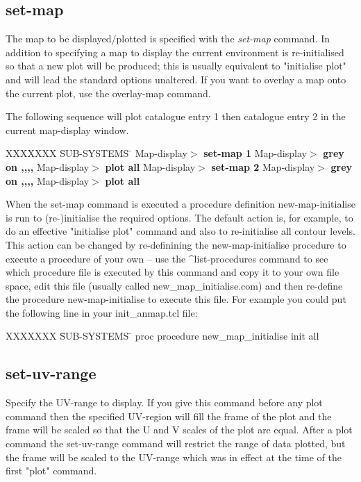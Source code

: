 \subsection{set-map}


The map to be displayed/plotted is specified with the 
{\em set-map} command.
In addition to specifying a map to display the current environment
is re-initialised so that a new plot will be produced; this is
usually equivalent to "initialise plot" and will lead the standard
options unaltered. If you want to overlay a map onto the current plot,
use the overlay-map command.

The following sequence will plot catalogue entry 1 then catalogue entry
2 in the current map-display window.
\begin{tabbing}
XXXXXXX \= SUB-SYSTEMS \= \kill
\>Map-display$>$ \> {\bf set-map 1}
\>Map-display$>$ \> {\bf grey on ,,,,}
\>Map-display$>$ \> {\bf plot all}
\>Map-display$>$ \> {\bf set-map 2}
\>Map-display$>$ \> {\bf grey on ,,,,}
\>Map-display$>$ \> {\bf plot all}
\end{tabbing}

When the set-map command is executed a procedure definition
new-map-initialise is run to (re-)initialise the required
options.  The default action is, for example, to do an
effective "initialise plot" command and also to re-initialise
all contour levels.  This action can be changed by re-definining
the new-map-initialise procedure to execute a procedure of your
own -- use the ^list-procedures command to see which procedure
file is executed by this command and copy it to your own file space,
edit this file (usually called new\_map\_initialise.com) and then
re-define the procedure new-map-initialise to execute this file.
For example you could put the following line in your init_anmap.tcl
file:
\begin{tabbing}
XXXXXXX \= SUB-SYSTEMS \= \kill
\> proc procedure new\_map\_initialise { } {
\> \> init all  
\> }
\end{tabbing}

\subsection{set-uv-range}


Specify the UV-range to display.  If you give this command
before any plot command then the specified UV-region will fill
the frame of the plot and the frame will be scaled so that
the U and V scales of the plot are equal.  After a plot command
the set-uv-range command will restrict the range of data plotted,
but the frame will be scaled to the UV-range which was in effect
at the time of the first "plot" command.


